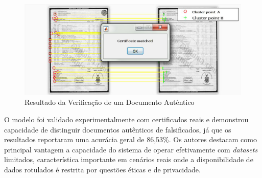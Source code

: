 \begin{figure}[H]
	\caption{\label{fig:clusterfraudverification}Resultado da Verificação de um Documento Autêntico}
    \begin{center}
    \includegraphics[width=1\linewidth]{images/clusterfraudverification.png}
	\end{center}
\end{figure}

O modelo foi validado experimentalmente com certificados reais e demonstrou capacidade de distinguir documentos autênticos de falsificados, já que os resultados reportaram uma acurácia geral de 86,53\%. Os autores destacam como principal vantagem a capacidade do sistema de operar efetivamente com \textit{datasets} limitados, característica importante em cenários reais onde a disponibilidade de dados rotulados é restrita por questões éticas e de privacidade.